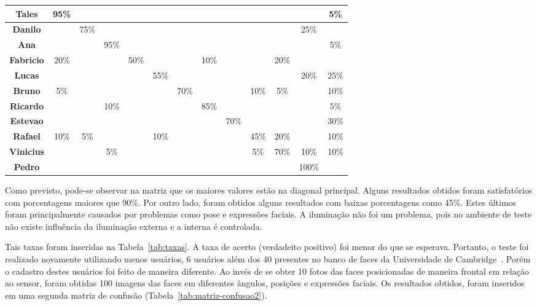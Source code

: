 \begin{table}[htb]
\begin{center}
\begin{tabular}{|c|c|c|c|c|c|c|c|c|c|c|c|c|}
				\hline \bf Tales 		& 95\% & 			& 		 & 			&   	 & 			& 		 & 			& 		 & 			& 		 & 5\%	\\ 
				\hline \bf Danilo 	& 		 & 75\% & 		 & 			&   	 & 			& 		 & 			& 		 & 			& 25\% &		 	\\
				\hline \bf Ana 			& 		 & 			& 95\% & 			&   	 & 			& 		 & 			& 		 & 			& 		 & 5\%  \\
				\hline \bf Fabricio & 20\% & 			& 		 & 50\% &      & 			& 10\% & 			&  	   & 20\% & 		 &		  \\
				\hline \bf Lucas 		& 		 & 			& 		 & 			& 55\% & 			& 		 & 			& 		 & 			& 20\% & 25\% \\
				\hline \bf Bruno 		& 5\%	 & 			& 		 & 			& 		 & 70\% & 		 & 			& 10\% & 	5\%	& 		 & 10\%	\\
				\hline \bf Ricardo 	& 		 & 			& 10\% & 			& 		 & 			& 85\% & 			& 		 & 			& 		 & 5\%  \\
				\hline \bf Estevao 	& 		 & 			& 		 & 			& 		 & 			& 		 & 70\% & 		 & 			& 		 & 30\% \\
				\hline \bf Rafael 	& 10\% & 	5\%	& 		 & 			& 10\% & 			& 		 & 			& 45\% & 20\% & 		 & 10\% \\
				\hline \bf Vinicius & 		 & 			& 5\%  & 			& 		 & 			& 		 & 			& 5\%  & 70\% & 10\% & 10\% \\
				\hline \bf Pedro 		& 		 & 			& 		 & 			& 		 & 			& 		 & 			& 		 & 			& 100\%&		  \\
				\hline
			\end{tabular}
		\end{center}
	\end{table}

	Como previsto, pode-se observar na matriz que os maiores valores estão na diagonal principal. Alguns resultados obtidos foram satisfatórios com porcentagens maiores que 90\%. Por outro lado, foram obtidos alguns resultados com baixas porcentagens como 45\%. Estes últimos foram principalmente causados por problemas como pose e expressões faciais. A iluminação não foi um problema, pois no ambiente de teste não existe influência da iluminação externa e a interna é controlada. 

	Tais taxas foram inseridas na Tabela~\ref{tab:taxas}. A taxa de acerto
	(verdadeito positivo) foi menor do que se esperava. Portanto, o teste foi
	realizado novamente utilizando menos usuários, 6 usuários além dos 40
	presentes no banco de faces da Universidade de
	Cambridge~\cite{cambridgeFaceDb}. Porém o cadastro destes usuários foi feito
	de maneira diferente. Ao invés de se obter 10 fotos das faces posicionadas de
	maneira frontal em relação ao sensor, foram obtidas 100 imagens das faces em
	diferentes ângulos, posições e expressões faciais. Os resultados obtidos, foram inseridos em uma
	segunda matriz de confusão (Tabela~\ref{tab:matriz-confusao2}).

